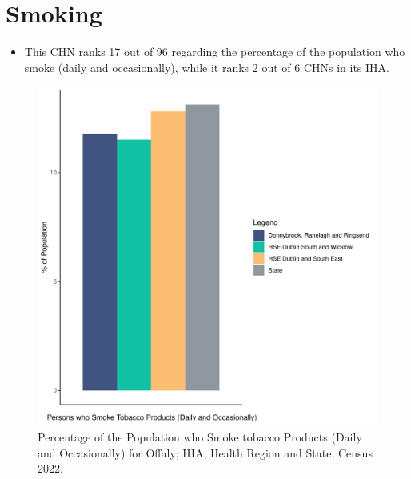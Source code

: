 \documentclass{article}
\begin{document}
\pagebreak

\section{Smoking}\label{sect:Smoking}
\begin{itemize}
\item This CHN ranks  17 out of 96 regarding the percentage of the population who smoke (daily and occasionally), while it ranks   2 out of 6 CHNs in its IHA.
\end{itemize}
\begin{figure}[H]
	\centering
	\includegraphics[width = 120mm]{../figures/SmokingED.pdf}
	\caption{Percentage of the Population who Smoke tobacco Products (Daily and Occasionally) for Offaly; IHA, Health Region and State; Census 2022.}
	\label{fig:2ae19629-1a6a-13a3-e055-000000000001}
	\end{figure}
	
\end{document}
